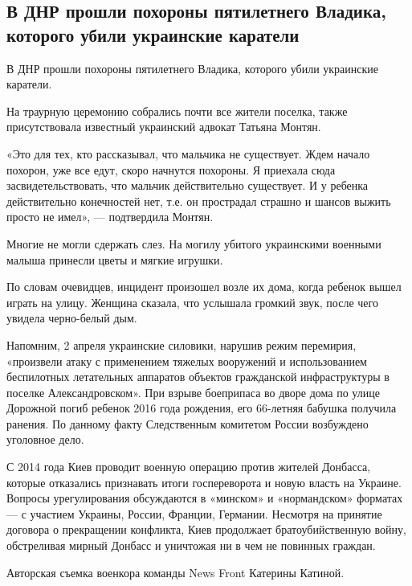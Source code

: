  
 
 
 
 

\subsection{В ДНР прошли похороны пятилетнего Владика, которого убили украинские каратели}
\label{sec:06_04_2021.fb.lnrgumo.1.pohoron_vladik}

В ДНР прошли похороны пятилетнего Владика, которого убили украинские каратели. 

На траурную церемонию собрались почти все жители поселка, также присутствовала известный украинский адвокат Татьяна Монтян. 

«Это для тех, кто рассказывал, что мальчика не существует. Ждем начало похорон,
уже все едут, скоро начнутся похороны. Я приехала сюда засвидетельствовать, что
мальчик действительно существует. И у ребенка действительно конечностей нет,
т.е. он прострадал страшно и шансов выжить просто не имел», — подтвердила
Монтян. 

Многие не могли сдержать слез. На могилу убитого украинскими военными малыша
принесли цветы и мягкие игрушки. 

По словам очевидцев, инцидент произошел возле их дома, когда ребенок вышел
играть на улицу. Женщина сказала, что услышала громкий звук, после чего увидела
черно-белый дым. 

Напомним, 2 апреля украинские силовики, нарушив режим перемирия, «произвели
атаку с применением тяжелых вооружений и использованием беспилотных летательных
аппаратов объектов гражданской инфраструктуры в поселке Александровском». При
взрыве боеприпаса во дворе дома по улице Дорожной погиб ребенок 2016 года
рождения, его 66-летняя бабушка получила ранения. По данному факту Следственным
комитетом России возбуждено уголовное дело. 

С 2014 года Киев проводит военную операцию против жителей Донбасса, которые
отказались признавать итоги госпереворота и новую власть на Украине. Вопросы
урегулирования обсуждаются в «минском» и «нормандском» форматах — с участием
Украины, России, Франции, Германии. Несмотря на принятие договора о прекращении
конфликта, Киев продолжает братоубийственную войну, обстреливая мирный Донбасс
и уничтожая ни в чем не повинных граждан. 

Авторская съемка военкора команды News Front Катерины Катиной.
